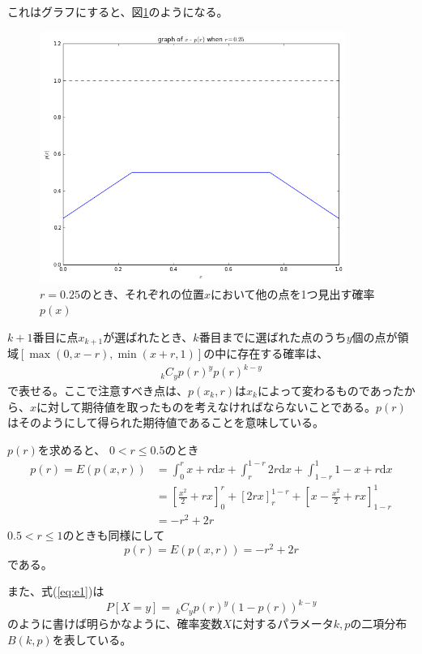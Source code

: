 これはグラフにすると、図\ref{fig:f3}のようになる。
\begin{figure}[H]
    \begin{center}
        \includegraphics[width=10cm]{../img/fig3.png}
        \caption{$r=0.25$のとき、それぞれの位置$x$において他の点を1つ見出す確率$p(x)$}
        \label{fig:f3}
    \end{center}
\end{figure}

$k+1$番目に点$x_{k+1}$が選ばれたとき、$k$番目までに選ばれた点のうち$y$個の点が領域$[\max(0,x-r), \min(x+r,1)]$の中に存在する確率は、
\begin{eqnarray}
_{k}C_{y}p(r)^{y}p(r)^{k-y}
\label{eq:e1}
\end{eqnarray}
で表せる。ここで注意すべき点は、$p(x_{k}, r)$は$x_{k}$によって変わるものであったから、$x$に対して期待値を取ったものを考えなければならないことである。$p(r)$はそのようにして得られた期待値であることを意味している。

$p(r)$を求めると、
$0<r\le0.5$のとき
\begin{align}p(r) = E(p(x, r)) &= \int^{r}_{0}x+r\mathrm{d}x + \int^{1-r}_{r}2r \mathrm{d}x + \int^{1}_{1-r} 1-x+r \mathrm{d}x\nonumber \\
&= \left[\frac{x^{2}}{2} + rx \right]^{r}_{0} + \left[ 2rx\right]^{1-r}_{r}+ \left[ x-\frac{x^{2}}{2} + rx\right]^{1}_{1-r}\nonumber \\
&= -r^{2} + 2r \end{align}
$0.5<r\le1$のときも同様にして
\[p(r) = E(p(x,r)) = -r^{2} + 2r\]
である。

また、式(\ref{eq:e1})は
\[P[X=y] =\ _{k}C_{y}p(r)^{y}(1-p(r))^{k-y}\]
のように書けば明らかなように、確率変数$X$に対するパラメータ$k,p$の二項分布$B(k,p)$を表している。

